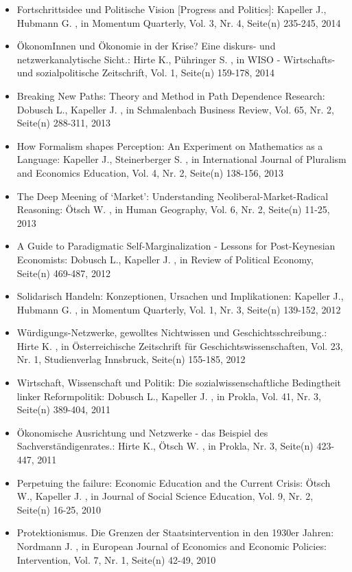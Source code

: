 \begin{itemize}
\item Fortschrittsidee und Politische Vision [Progress and Politics]: Kapeller J., Hubmann G. , in Momentum Quarterly, Vol. 3, Nr. 4, Seite(n) 235-245, 2014
\item ÖkonomInnen und Ökonomie in der Krise? Eine diskurs- und netzwerkanalytische Sicht.: Hirte K., Pühringer S. , in WISO - Wirtschafts- und sozialpolitische Zeitschrift, Vol. 1, Seite(n) 159-178, 2014
\item Breaking New Paths: Theory and Method in Path Dependence Research: Dobusch L., Kapeller J. , in Schmalenbach Business Review, Vol. 65, Nr. 2, Seite(n) 288-311, 2013
\item How Formalism shapes Perception: An Experiment on Mathematics as a Language: Kapeller J., Steinerberger S. , in International Journal of Pluralism and Economics Education, Vol. 4, Nr. 2, Seite(n) 138-156, 2013
\item The Deep Meening of ‘Market’: Understanding Neoliberal-Market-Radical Reasoning: Ötsch W. , in Human Geography, Vol. 6, Nr. 2, Seite(n) 11-25, 2013
\item A Guide to Paradigmatic Self-Marginalization - Lessons for Post-Keynesian Economists: Dobusch L., Kapeller J. , in Review of Political Economy, Seite(n) 469-487, 2012
\item Solidarisch Handeln: Konzeptionen, Ursachen und Implikationen: Kapeller J., Hubmann G. , in Momentum Quarterly, Vol. 1, Nr. 3, Seite(n) 139-152, 2012
\item Würdigungs-Netzwerke, gewolltes Nichtwissen und Geschichtsschreibung.: Hirte K. , in Österreichische Zeitschrift für Geschichtswissenschaften, Vol. 23, Nr. 1, Studienverlag Innsbruck, Seite(n) 155-185, 2012
\item Wirtschaft, Wissenschaft und Politik: Die sozialwissenschaftliche Bedingtheit linker Reformpolitik: Dobusch L., Kapeller J. , in Prokla, Vol. 41, Nr. 3, Seite(n) 389-404, 2011
\item Ökonomische Ausrichtung und Netzwerke - das Beispiel des Sachverständigenrates.: Hirte K., Ötsch W. , in Prokla, Nr. 3, Seite(n) 423-447, 2011
\item Perpetuing the failure: Economic Education and the Current Crisis: Ötsch W., Kapeller J. , in Journal of Social Science Education, Vol. 9, Nr. 2, Seite(n) 16-25, 2010
\item Protektionismus. Die Grenzen der Staatsintervention in den 1930er Jahren: Nordmann J. , in European Journal of Economics and Economic Policies: Intervention, Vol. 7, Nr. 1, Seite(n) 42-49, 2010

\end{itemize}
